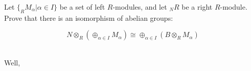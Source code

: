 Let $\{_RM_{\alpha}|\alpha\in I\}$ be a set of left $R$-modules, and let $_NR$ be a right $R$-module.
Prove that there is an isomorphism of abelian groups: 

$$N\otimes_R(\oplus_{\alpha\in I}M_{\alpha})\cong\oplus_{\alpha\in I}(B\otimes_RM_{\alpha})$$

\begin{solution}\renewcommand{\qedsymbol}{}\ \\
    Well,
\end{solution}